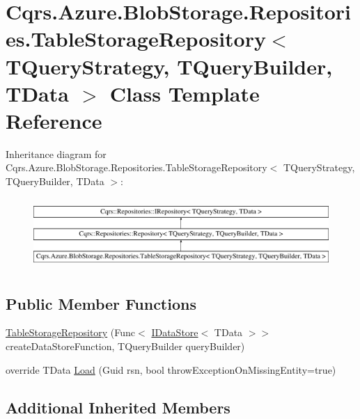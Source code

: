 \hypertarget{classCqrs_1_1Azure_1_1BlobStorage_1_1Repositories_1_1TableStorageRepository}{}\section{Cqrs.\+Azure.\+Blob\+Storage.\+Repositories.\+Table\+Storage\+Repository$<$ T\+Query\+Strategy, T\+Query\+Builder, T\+Data $>$ Class Template Reference}
\label{classCqrs_1_1Azure_1_1BlobStorage_1_1Repositories_1_1TableStorageRepository}
Inheritance diagram for Cqrs.\+Azure.\+Blob\+Storage.\+Repositories.\+Table\+Storage\+Repository$<$ T\+Query\+Strategy, T\+Query\+Builder, T\+Data $>$\+:\begin{figure}[H]
\begin{center}
\leavevmode
\includegraphics[height=2.722852cm]{classCqrs_1_1Azure_1_1BlobStorage_1_1Repositories_1_1TableStorageRepository}
\end{center}
\end{figure}
\subsection*{Public Member Functions}
\begin{DoxyCompactItemize}
\item 
\hyperlink{classCqrs_1_1Azure_1_1BlobStorage_1_1Repositories_1_1TableStorageRepository_a2c98507c1cdd4ed740a8d881a4e779e1}{Table\+Storage\+Repository} (Func$<$ \hyperlink{interfaceCqrs_1_1DataStores_1_1IDataStore}{I\+Data\+Store}$<$ T\+Data $>$$>$ create\+Data\+Store\+Function, T\+Query\+Builder query\+Builder)
\item 
override T\+Data \hyperlink{classCqrs_1_1Azure_1_1BlobStorage_1_1Repositories_1_1TableStorageRepository_a7238452f19c9d51b5733df7701920605}{Load} (Guid rsn, bool throw\+Exception\+On\+Missing\+Entity=true)
\end{DoxyCompactItemize}
\subsection*{Additional Inherited Members}


